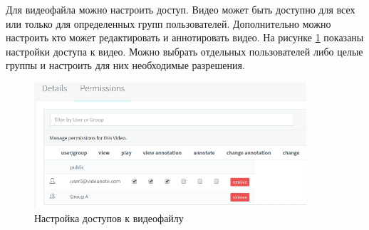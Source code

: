 Для видеофайла можно настроить доступ. Видео может быть доступно для всех или только для
определенных групп пользователей. Дополнительно можно настроить кто может редактировать и
аннотировать видео. На рисунке \ref{permissions} показаны настройки доступа к видео. Можно
выбрать отдельных пользователей либо целые группы и настроить для них необходимые разрешения.

\begin{figure}
  \centering
  \includegraphics[width=0.9\textwidth]{images/permissions.jpg}
  \caption{Настройка доступов к видеофайлу}\label{permissions}
\end{figure}
